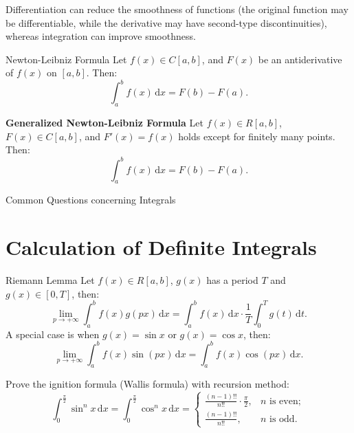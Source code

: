 \documentclass[11pt]{../../TexTemplate/elegantbook}
\begin{document}
\begin{remark}
        Differentiation can reduce the smoothness of functions (the original function may be differentiable, 
        while the derivative may have second-type discontinuities), whereas integration can improve smoothness.
\end{remark}

\begin{theorem}{Newton-Leibniz Formula}
    Let \( f(x) \in C[a, b] \), and \( F(x) \) be an antiderivative of \( f(x) \) on \( [a, b] \). Then:
    \[
    \int_{a}^{b} f(x) \, \mathrm{d}x = F(b) - F(a).
    \]

    \textbf{Generalized Newton-Leibniz Formula}
    Let \( f(x) \in R[a, b] \), \( F(x) \in C[a, b] \), and \( F'(x) = f(x) \) holds except for finitely many points. 
    Then:
    \[
    \int_{a}^{b} f(x) \, \mathrm{d}x = F(b) - F(a).
    \]
\end{theorem}



\begin{leftbarTitle}{Common Questions concerning Integrals}\end{leftbarTitle}

\section{Calculation of Definite Integrals}

\begin{lemma}{Riemann Lemma}
    Let \( f(x) \in R[a, b] \), \( g(x) \) has a period \( T \) and \( g(x) \in [0, T] \),
    then:
    \[
    \lim_{p \to +\infty}\int_{a}^{b} f(x)g(px) \, \mathrm{d}x 
    = \int_{a}^{b} f(x) \, \mathrm{d}x \cdot \frac{1}{T} \int_{0}^{T} g(t) \, \mathrm{d}t.
    \]
    A special case is when \( g(x) = \sin x \) or \( g(x) = \cos x \), then:
    \[
    \lim_{p \to +\infty}\int_{a}^{b} f(x)\sin(px) \, \mathrm{d}x 
    = \int_{a}^{b} f(x)\cos(px) \, \mathrm{d}x.
    \]
\end{lemma}


\begin{example}
    Prove the ignition formula (Wallis formula) with recursion method:
    \[
    \int_{0}^{\frac{\pi}{2}} \sin^{n} x \, \mathrm{d}x 
    = \int_{0}^{\frac{\pi}{2}} \cos^{n} x \, \mathrm{d}x
    = \begin{cases}
    \frac{(n-1)!!}{n!!} \cdot \frac{\pi}{2}, & n \text{ is even}; \\
    \frac{(n-1)!!}{n!!}, & n \text{ is odd}.
    \end{cases}
    \]
\end{example}
\end{document}
